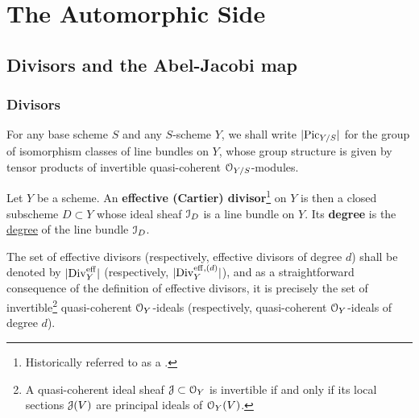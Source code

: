 \section{The Automorphic Side}
    \subsection{Divisors and the Abel-Jacobi map}
        \subsubsection{Divisors}
            \begin{convention} \label{conv: picard_group}
                For any base scheme $S$ and any $S$-scheme $Y$, we shall write $|\mathrm{Pic}_{Y/S}|$ for the group of isomorphism classes of line bundles on $Y$, whose group structure is given by tensor products of invertible quasi-coherent $\mathcal{O}_{Y/S}$-modules.
            \end{convention}
            \begin{definition}[Divisors] \label{def: divisors}
                Let $Y$ be a scheme. An \textbf{effective (Cartier) divisor}\footnote{Historically referred to as a .} on $Y$ is then a closed subscheme $D \subset Y$ whose ideal sheaf $\mathcal{I}_D$ is a line bundle on $Y$. Its \textbf{degree} is the \href{https://stacks.math.columbia.edu/tag/0AYQ}{\underline{degree}} of the line bundle $\mathcal{I}_D$.  
                    
                The set of effective divisors (respectively, effective divisors of degree $d$) shall be denoted by $|\mathrm{Div}_Y^{\mathrm{eff}}|$ (respectively, $|\mathrm{Div}_Y^{\mathrm{eff}, (d)}|$), and as a straightforward consequence of the definition of effective divisors, it is precisely the set of invertible\footnote{A quasi-coherent ideal sheaf $\mathcal{J} \subset \mathcal{O}_Y$ is invertible if and only if its local sections $\mathcal{J}(V)$ are principal ideals of $\mathcal{O}_Y(V)$.} quasi-coherent $\mathcal{O}_Y$-ideals (respectively, quasi-coherent $\mathcal{O}_Y$-ideals of degree $d$).
            \end{definition}
